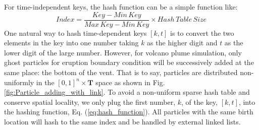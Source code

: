 \documentclass[procedia]{easychair}
\begin{document}
For time-independent keys, the hash function can be a simple function like:
\begin{equation}
Index= \frac{Key - Min\,Key}{Max\,Key - Min\,Key} 
\times Hash\,Table\,Size 
\label{eq:hash_function}
\end{equation}
One natural way to hash time-dependent keys $[k,t]$ is to convert the two elements in the key into one number taking $k$ as the higher digit and $t$ as the lower digit of the large number. However, for volcano plume simulation, only ghost particles for eruption boundary condition will be successively added at the same place: the bottom of the vent. That is to say, particles are distributed non-uniformly in the $[0,1]^n \times \textbf{T}$ space as shown in Fig. \ref{fig:Particle_adding_with_link}. To avoid a non-uniform sparse hash table and conserve spatial locality, we only plug the first number, $k$, of the key, $[k,t]$, into the hashing function, Eq. (\ref{eq:hash_function}). All particles with the same birth location will hash to the same index and be handled by external linked lists.
\end{document}
